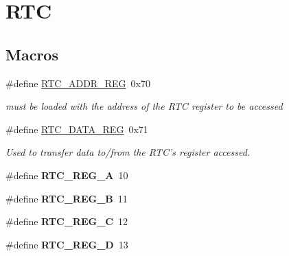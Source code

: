 \hypertarget{group___r_t_c}{\section{R\-T\-C}
\label{group___r_t_c}
}
\subsection*{Macros}
\begin{DoxyCompactItemize}
\item 
\hypertarget{group___r_t_c_ga710b98232df2c563009e6f8a6cd18220}{\#define \hyperlink{group___r_t_c_ga710b98232df2c563009e6f8a6cd18220}{R\-T\-C\-\_\-\-A\-D\-D\-R\-\_\-\-R\-E\-G}~0x70}\label{group___r_t_c_ga710b98232df2c563009e6f8a6cd18220}

\begin{DoxyCompactList}\small\item\em must be loaded with the address of the R\-T\-C register to be accessed \end{DoxyCompactList}\item 
\hypertarget{group___r_t_c_ga2f258a00c59c3f347c8d2d4a75471ce0}{\#define \hyperlink{group___r_t_c_ga2f258a00c59c3f347c8d2d4a75471ce0}{R\-T\-C\-\_\-\-D\-A\-T\-A\-\_\-\-R\-E\-G}~0x71}\label{group___r_t_c_ga2f258a00c59c3f347c8d2d4a75471ce0}

\begin{DoxyCompactList}\small\item\em Used to transfer data to/from the R\-T\-C's register accessed. \end{DoxyCompactList}\item 
\hypertarget{group___r_t_c_gae5ffad506b363f28bed1bb5e5926bd2d}{\#define {\bfseries R\-T\-C\-\_\-\-R\-E\-G\-\_\-\-A}~10}\label{group___r_t_c_gae5ffad506b363f28bed1bb5e5926bd2d}

\item 
\hypertarget{group___r_t_c_ga03954a63ead3f02b7790ce79e9877eea}{\#define {\bfseries R\-T\-C\-\_\-\-R\-E\-G\-\_\-\-B}~11}\label{group___r_t_c_ga03954a63ead3f02b7790ce79e9877eea}

\item 
\hypertarget{group___r_t_c_ga1bd6f771dc313129723812fe7ac52d9e}{\#define {\bfseries R\-T\-C\-\_\-\-R\-E\-G\-\_\-\-C}~12}\label{group___r_t_c_ga1bd6f771dc313129723812fe7ac52d9e}

\item 
\hypertarget{group___r_t_c_ga34c8604ade07f4f7ff7e919f2d4c56b4}{\#define {\bfseries R\-T\-C\-\_\-\-R\-E\-G\-\_\-\-D}~13}\label{group___r_t_c_ga34c8604ade07f4f7ff7e919f2d4c56b4}


\end{DoxyCompactItemize}
